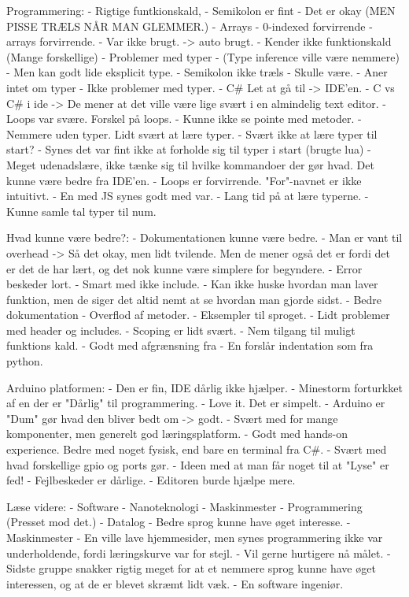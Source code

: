 Programmering:
- Rigtige funtkionskald,
- Semikolon er fint - Det er okay (MEN PISSE TRÆLS NÅR MAN GLEMMER.)
- Arrays - 0-indexed forvirrende - arrays forvirrende.
- Var ikke brugt. -> auto brugt.
- Kender ikke funktionskald (Mange forskellige)
- Problemer med typer - (Type inference ville være nemmere) - Men kan godt lide eksplicit type.
- Semikolon ikke træls - Skulle være.
- Aner intet om typer 
- Ikke problemer med typer.
- C{\#} Let at gå til -> IDE'en. 
- C vs C{\#} i ide -> De mener at det ville være lige svært i en almindelig text editor.
- Loops var svære. Forskel på loops.
- Kunne ikke se pointe med metoder.
- Nemmere uden typer. Lidt svært at lære typer.
- Svært ikke at lære typer til start?
- Synes det var fint ikke at forholde sig til typer i start (brugte lua)
- Meget udenadslære, ikke tænke sig til hvilke kommandoer der gør hvad. Det kunne være bedre fra IDE'en.
- Loops er forvirrende. "For"-navnet er ikke intuitivt. 
- En med JS synes godt med var.
- Lang tid på at lære typerne.
- Kunne samle tal typer til num.

Hvad kunne være bedre?: 
- Dokumentationen kunne være bedre.
- Man er vant til overhead -> Så det okay, men lidt tvilende. Men de mener også det er fordi det er det de har lært, og det nok kunne være simplere for begyndere.
- Error beskeder lort.
- Smart med ikke include.
- Kan ikke huske hvordan man laver funktion, men de siger det altid nemt at se hvordan man gjorde sidst.
- Bedre dokumentation
- Overflod af metoder.
- Eksempler til sproget.
- Lidt problemer med header og includes.
- Scoping er lidt svært.
- Nem tilgang til muligt funktions kald.
- Godt med afgrænsning fra {}
- En forslår indentation som fra python.

Arduino platformen:
- Den er fin, IDE dårlig ikke hjælper.
- Minestorm forturkket af en der er "Dårlig" til programmering.
- Love it. Det er simpelt.
- Arduino er "Dum" gør hvad den bliver bedt om -> godt.
- Svært med for mange komponenter, men generelt god læringsplatform.
- Godt med hands-on experience. Bedre med noget fysisk, end bare en terminal fra C{\#}.
- Svært med hvad forskellige gpio og ports gør.
- Ideen med at man får noget til at "Lyse" er fed!
- Fejlbeskeder er dårlige.
- Editoren burde hjælpe mere.


Læse videre:
- Software
- Nanoteknologi
- Maskinmester
- Programmering (Presset mod det.)
- Datalog 
- Bedre sprog kunne have øget interesse.
- Maskinmester
- En ville lave hjemmesider, men synes programmering ikke var underholdende, fordi læringskurve var for stejl.
- Vil gerne hurtigere nå målet.
- Sidste gruppe snakker rigtig meget for at et nemmere sprog kunne have øget interessen, og at de er blevet skræmt lidt væk.
- En software ingeniør. 


